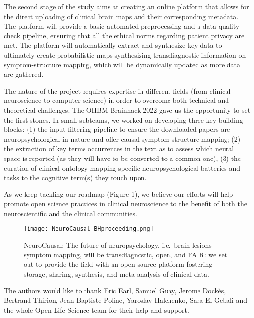 \documentclass[../main.tex]{subfiles}
\begin{document}
The second stage of the study aims at creating an online platform that allows for the direct uploading of clinical brain maps and their corresponding metadata. The platform will provide a basic automated preprocessing and a data-quality check pipeline, ensuring that all the ethical norms regarding patient privacy are met. The platform will automatically extract and synthesize key data to ultimately create probabilistic maps synthesizing transdiagnostic information on symptom-structure mapping, which will be dynamically updated as more data are gathered.

The nature of the project requires expertise in different fields (from clinical neuroscience to computer science) in order to overcome both technical and theoretical challenges. The OHBM Brainhack 2022 gave us the opportunity to set the first stones. In small subteams, we worked on developing three key building blocks: (1) the input filtering pipeline to ensure the downloaded papers are neuropsychological in nature and offer causal symptom-structure mapping; (2) the extraction of key terms occurrences in the text as to assess which neural space is reported (as they will have to be converted to a common one), (3) the curation of clinical ontology mapping specific neuropsychological batteries and tasks to the cognitive term(s) they touch upon.

As we keep tackling our roadmap (Figure 1), we believe our efforts will help promote open science practices in clinical neuroscience to the benefit of both the neuroscientific and the clinical communities.


\begin{figure}
	\centering
	\texttt{[image: NeuroCausal\_BHproceeding.png]}
	\caption{NeuroCausal: The future of neuropsychology, i.e.\ brain lesions-symptom mapping, will be transdiagnostic, open, and FAIR: we set out to provide the field with an open-source platform fostering storage, sharing, synthesis, and meta-analysis of clinical data.
}
	\label{fig:NeuroCausal}
\end{figure}

 The authors would like to thank Eric Earl, Samuel Guay, Jerome Dockès, Bertrand Thirion, Jean Baptiste Poline, Yaroslav Halchenko, Sara El-Gebali and the whole Open Life Science team for their help and support.
\end{document}
